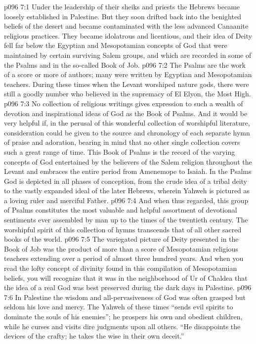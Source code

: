 \vs p096 7:1 Under the leadership of their sheiks and priests the Hebrews became loosely established in Palestine. But they soon drifted back into the benighted beliefs of the desert and became contaminated with the less advanced Canaanite religious practices. They became idolatrous and licentious, and their idea of Deity fell far below the Egyptian and Mesopotamian concepts of God that were maintained by certain surviving Salem groups, and which are recorded in some of the Psalms and in the so\hyp{}called Book of Job.
\vs p096 7:2 \pc The Psalms are the work of a score or more of authors; many were written by Egyptian and Mesopotamian teachers. During these times when the Levant worshiped nature gods, there were still a goodly number who believed in the supremacy of El Elyon, the Most High.
\vs p096 7:3 No collection of religious writings gives expression to such a wealth of devotion and inspirational ideas of God as the Book of Psalms. And it would be very helpful if, in the perusal of this wonderful collection of worshipful literature, consideration could be given to the source and chronology of each separate hymn of praise and adoration, bearing in mind that no other single collection covers such a great range of time. This Book of Psalms is the record of the varying concepts of God entertained by the believers of the Salem religion throughout the Levant and embraces the entire period from Amenemope to Isaiah. In the Psalms God is depicted in all phases of conception, from the crude idea of a tribal deity to the vastly expanded ideal of the later Hebrews, wherein Yahweh is pictured as a loving ruler and merciful Father.
\vs p096 7:4 And when thus regarded, this group of Psalms constitutes the most valuable and helpful assortment of devotional sentiments ever assembled by man up to the times of the twentieth century. The worshipful spirit of this collection of hymns transcends that of all other sacred books of the world.
\vs p096 7:5 \pc The variegated picture of Deity presented in the Book of Job was the product of more than a score of Mesopotamian religious teachers extending over a period of almost three hundred years. And when you read the lofty concept of divinity found in this compilation of Mesopotamian beliefs, you will recognize that it was in the neighborhood of Ur of Chaldea that the idea of a real God was best preserved during the dark days in Palestine.
\vs p096 7:6 In Palestine the wisdom and all\hyp{}pervasiveness of God was often grasped but seldom his love and mercy. The Yahweh of these times “sends evil spirits to dominate the souls of his enemies”; he prospers his own and obedient children, while he curses and visits dire judgments upon all others. “He disappoints the devices of the crafty; he takes the wise in their own deceit.”

